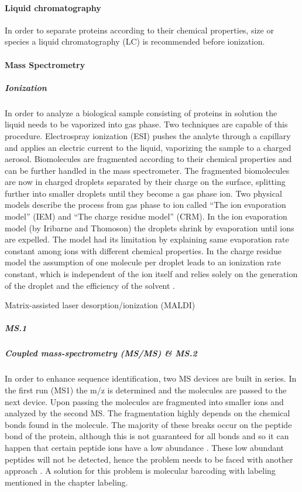 \documentclass[
]{article}
\begin{document}
\hypertarget{liquid-chromatography}{%
\paragraph{Liquid chromatography}\label{liquid-chromatography}}

In order to separate proteins according to their chemical properties,
size or species a liquid chromatography (LC) is recommended before
ionization.

\hypertarget{mass-spectrometry}{%
\paragraph{Mass Spectrometry}\label{mass-spectrometry}}

\hypertarget{ionization}{%
\subparagraph{Ionization}\label{ionization}}

In order to analyze a biological sample consisting of proteins in
solution the liquid needs to be vaporized into gas phase. Two techniques
are capable of this procedure. Electrospray ionization (ESI) pushes the
analyte through a capillary and applies an electric current to the
liquid, vaporizing the sample to a charged aerosol. Biomolecules are
fragmented according to their chemical properties and can be further
handled in the mass spectrometer. The fragmented biomolecules are now in
charged droplets separated by their charge on the surface, splitting
further into smaller droplets until they become a gas phase ion. Two
physical models describe the process from gas phase to ion called ``The
ion evaporation model'' (IEM) and ``The charge residue model'' (CRM). In
the ion evaporation model (by Iribarne and Thomoson) the droplets shrink
by evaporation until ions are expelled. The model had its limitation by
explaining same evaporation rate constant among ions with different
chemical properties. In the charge residue model the assumption of one
molecule per droplet leads to an ionization rate constant, which is
independent of the ion itself and relies solely on the generation of the
droplet and the efficiency of the solvent \citep{Wilm2011}.

Matrix-assisted laser desorption/ionization (MALDI)

\hypertarget{ms.1}{%
\subparagraph{MS.1}\label{ms.1}}

\hypertarget{coupled-mass-spectrometry-msms-ms.2}{%
\subparagraph{Coupled mass-spectrometry (MS/MS) \&
MS.2}\label{coupled-mass-spectrometry-msms-ms.2}}

In order to enhance sequence identification, two MS devices are built in
series. In the first run (MS1) the m/z is determined and the molecules
are passed to the next device. Upon passing the molecules are fragmented
into smaller ions and analyzed by the second MS. The fragmentation
highly depends on the chemical bonds found in the molecule. The majority
of these breaks occur on the peptide bond of the protein, although this
is not guaranteed for all bonds and so it can happen that certain
peptide ions have a low abundance \citep{Budnik2018}. These low abundant
peptides will not be detected, hence the problem needs to be faced with
another approach . A solution for this problem is molecular barcoding
with labeling mentioned in the chapter labeling.
\end{document}
